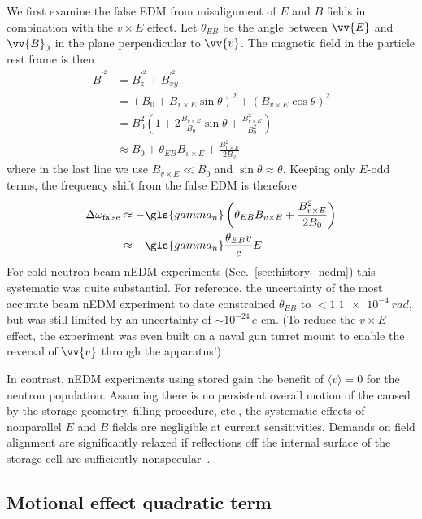 We first examine the false EDM from misalignment of $E$ and $B$ fields in combination with the $v\times E$ effect. Let $\theta_{EB}$ be the angle between $\vv{E}$ and $\vv{B}_0$ in the plane perpendicular to $\vv{v}$. The magnetic field in the particle rest frame is then~\cite{lamoreaux_experimental_2009}
%
\begin{align}
    B^{\prime^2} &= B^{\prime^2}_z + B^{\prime^2}_{xy} \\
    &= (B_0 +  B_{v\times E}\sin\theta)^2 + ( B_{v\times E}\cos\theta)^2 \\
    &= B_0^2\left(1 + 2\frac{ B_{v\times E}}{B_0}\sin\theta + \frac{ B_{v\times E}^2}{B_0^2}\right)\\
    &\approx B_0 + \theta_{EB} B_{v\times E} + \frac{B_{v\times E}^2}{2B_0}
\end{align}
%
where in the last line we use $B_{v\times E} \ll B_0$ and $\sin\theta\approx\theta$. Keeping only $E$-odd terms, the frequency shift from the false EDM is therefore
%
\begin{align}
    \Delta\omega_\text{false} &\approx -\gls{gamma_n}\left( \theta_{EB} B_{v\times E} + \frac{B_{v\times E}^2}{2B_0} \right) \label{eq:vxE_motional_shift}\\
    &\approx -\gls{gamma_n} \frac{\theta_{EB}v}{c}E 
\end{align}
%
For cold neutron beam nEDM experiments (Sec.~\ref{sec:history_nedm}) this systematic was quite substantial. For reference, the uncertainty of the most accurate beam nEDM experiment to date \cite{dress_nedm_1977} constrained $\theta_{EB}$ to $<\qty{1.1e-4}{rad}$, but was still limited by an uncertainty of $\sim 10^{-24}\,e\text{ cm}$. (To reduce the $v\times E$ effect, the experiment was even built on a naval gun turret mount to enable the reversal of $\vv{v}$ through the apparatus!) 

In contrast, nEDM experiments using stored \ucn gain the benefit of $\langle v \rangle =0$ for the neutron population. Assuming there is no persistent overall motion of the \ucn caused by the storage geometry, filling procedure, etc., the systematic effects of nonparallel $E$ and $B$ fields are negligible at current sensitivities. Demands on field alignment are significantly relaxed if \ucn reflections off the internal surface of the storage cell are sufficiently nonspecular~\cite{pendlebury_revised_2015}.

\subsection*{Motional effect quadratic term}

